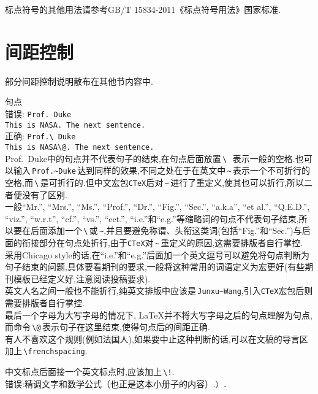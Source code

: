 \documentclass[a4paper]{article}
\newcommand{\sj}{\hspace*{2.8em}}
\begin{document}
标点符号的其他用法请参考GB/T 15834-2011《标点符号用法》国家标准.\eop

\section{间距控制}
部分间距控制说明散布在其他节内容中.\eop
\begin{compactitem}[\hspace{1.02em}$\bullet$]
	\item 句点\\
	\textsf{错误}: \verb|Prof. Duke|\\
	\sj  \verb|This is NASA. The next sentence.|\\
	\textsf{正确}: \verb|Prof.\ Duke|\\
	\sj  \verb|This is NASA\@. The next sentence.|\\
	Prof.\ Duke中的句点并不代表句子的结束,在句点后面放置\,\verb*|\ |\,表示一般的空格.也可以输入\,\verb|Prof.~Duke|\,达到同样的效果,不同之处在于在英文中\,\verb|~|\,表示一个不可折行的空格,而\,\verb|\|\texttt{\textvisiblespace}\,是可折行的.但中文宏包\texttt{C\TeX{}}后对\,\verb|~|\,进行了重定义,使其也可以折行,所以二者便没有了区别.\\
	一般``Mr.'', ``Mrs.'', ``Ms.'', ``Prof.'', ``Dr.'', ``Fig.'', ``Sec.'', ``a.k.a'', ``et al.'', ``Q.E.D.'', ``viz.'', ``w.r.t'', ``cf.'', ``vs.'', ``ect.'', ``i.e.''和``e.g.''等缩略词的句点不代表句子结束,所以要在后面添加一个\,\verb|\|\,或\,\verb|~|,并且要避免称谓、头衔这类词(包括``Fig.''和``Sec.'')与后面的衔接部分在句点处折行,由于\texttt{C\TeX}对\,\verb|~|\,重定义的原因,这需要排版者自行掌控.\\
	采用Chicago style的话,在``i.e.''和``e.g.''后面加一个英文逗号可以避免将句点判断为句子结束的问题,具体要看期刊的要求,一般将这种常用的词语定义为宏更好(有些期刊模板已经定义好,注意阅读投稿要求).\\
	英文人名之间一般也不能折行,纯英文排版中应该是\,\verb|Junxu~Wang|,引入\texttt{C\TeX}宏包后则需要排版者自行掌控.\\
	最后一个字母为大写字母的情况下, \LaTeX{}并不将大写字母之后的句点理解为句点,而命令\,\verb|\@|\,表示句子在这里结束,使得句点后的间距正确.\\
	有人不喜欢这个规则(例如法国人),如果要中止这种判断的话,可以在文稿的导言区加上\,\verb|\frenchspacing|.
	\item 中文标点后面接一个英文标点时,应该加上\,\verb|\!|.\\
	\textsf{错误}:精调文字和数学公式（也正是这本小册子的内容）.\quad \verb|）.|\\

\end{compactitem}
\end{document}
